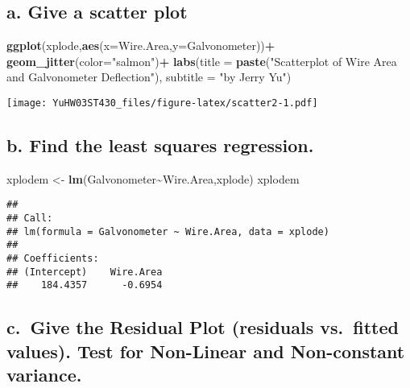 \documentclass[
]{article}
\newenvironment{Shaded}{\begin{snugshade}}{\end{snugshade}}
\newcommand{\AttributeTok}[1]{\textcolor[rgb]{0.13,0.29,0.53}{#1}}
\newcommand{\FunctionTok}[1]{\textcolor[rgb]{0.13,0.29,0.53}{\textbf{#1}}}
\newcommand{\NormalTok}[1]{#1}
\newcommand{\OtherTok}[1]{\textcolor[rgb]{0.56,0.35,0.01}{#1}}
\newcommand{\SpecialCharTok}[1]{\textcolor[rgb]{0.81,0.36,0.00}{\textbf{#1}}}
\newcommand{\StringTok}[1]{\textcolor[rgb]{0.31,0.60,0.02}{#1}}
\begin{document}
\hypertarget{a.-give-a-scatter-plot}{%
\subsection{a. Give a scatter plot}\label{a.-give-a-scatter-plot}}

\begin{Shaded}
\begin{Highlighting}[]
\FunctionTok{ggplot}\NormalTok{(xplode,}\FunctionTok{aes}\NormalTok{(}\AttributeTok{x=}\NormalTok{Wire.Area,}\AttributeTok{y=}\NormalTok{Galvonometer))}\SpecialCharTok{+}
  \FunctionTok{geom\_jitter}\NormalTok{(}\AttributeTok{color=}\StringTok{"salmon"}\NormalTok{)}\SpecialCharTok{+}
  \FunctionTok{labs}\NormalTok{(}\AttributeTok{title =} \FunctionTok{paste}\NormalTok{(}\StringTok{"Scatterplot of Wire Area and Galvonometer Deflection"}\NormalTok{),}
         \AttributeTok{subtitle =} \StringTok{"by Jerry Yu"}\NormalTok{)}
\end{Highlighting}
\end{Shaded}

\texttt{[image: YuHW03ST430\_files/figure-latex/scatter2-1.pdf]}

\hypertarget{b.-find-the-least-squares-regression.}{%
\subsection{b. Find the least squares
regression.}\label{b.-find-the-least-squares-regression.}}

\begin{Shaded}
\begin{Highlighting}[]
\NormalTok{xplodem }\OtherTok{\textless{}{-}} \FunctionTok{lm}\NormalTok{(Galvonometer}\SpecialCharTok{\textasciitilde{}}\NormalTok{Wire.Area,xplode)}
\NormalTok{xplodem}
\end{Highlighting}
\end{Shaded}

\begin{verbatim}
## 
## Call:
## lm(formula = Galvonometer ~ Wire.Area, data = xplode)
## 
## Coefficients:
## (Intercept)    Wire.Area  
##    184.4357      -0.6954
\end{verbatim}

\hypertarget{c.-give-the-residual-plot-residuals-vs.-fitted-values.-test-for-non-linear-and-non-constant-variance.}{%
\subsection{c.~Give the Residual Plot (residuals vs.~fitted values).
Test for Non-Linear and Non-constant
variance.}\label{c.-give-the-residual-plot-residuals-vs.-fitted-values.-test-for-non-linear-and-non-constant-variance.}}
\end{document}
